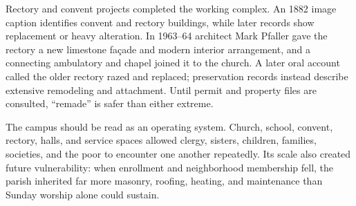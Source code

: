 Rectory and convent projects completed the working complex. An 1882 image caption identifies convent and rectory buildings, while later records show replacement or heavy alteration. In 1963--64 architect Mark Pfaller gave the rectory a new limestone façade and modern interior arrangement, and a connecting ambulatory and chapel joined it to the church. A later oral account called the older rectory razed and replaced; preservation records instead describe extensive remodeling and attachment. Until permit and property files are consulted, ``remade'' is safer than either extreme.

The campus should be read as an operating system. Church, school, convent, rectory, halls, and service spaces allowed clergy, sisters, children, families, societies, and the poor to encounter one another repeatedly. Its scale also created future vulnerability: when enrollment and neighborhood membership fell, the parish inherited far more masonry, roofing, heating, and maintenance than Sunday worship alone could sustain.

